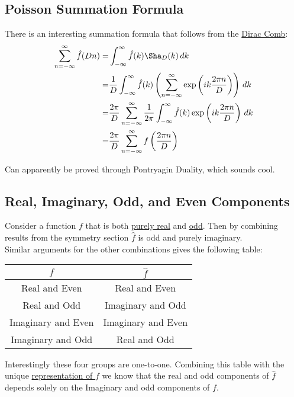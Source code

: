 \documentclass[12pt]{report}
\begin{document}
\subsection{Poisson Summation Formula}
There is an interesting summation formula that follows from the \hyperref[appx:dirac-comb]{Dirac Comb}:
\begin{equation*}
\begin{aligned}
	\sum_{n=-\infty}^{\infty}\hat{f}(Dn) = & \int_{-\infty}^{\infty}\hat{f}(k)\Sha_D(k)\,dk \\
	= &\frac{1}{D} \int_{-\infty}^{\infty}\hat{f}(k)\left(\sum_{n=-\infty}^{\infty}\exp\left(ik \frac{2\pi n}{D}\right)\right)\,dk\\
	= &\frac{2\pi}{D} \sum_{n=-\infty}^{\infty}\frac{1}{2\pi}\int_{-\infty}^{\infty}\hat{f}(k)\exp\left(ik \frac{2\pi n}{D}\right)\,dk\\
	= &\frac{2\pi}{D} \sum_{n=-\infty}^{\infty}f\left(\frac{2\pi n}{D}\right)\\
\end{aligned}
\end{equation*}

Can apparently be proved through Pontryagin Duality, which sounds cool. 

\subsection{Real, Imaginary, Odd, and Even Components}
Consider a function $f$ that is both \hyperref[sec:conjugation-sym]{purely real} and \hyperref[sec:parity-sym]{odd}.
Then by combining results from the symmetry section $\hat{f}$ is odd and purely imaginary.
\\

Similar arguments for the other combinations gives the following table:

\begin{center}
\begin{tabular}{c|c}
	$f$ & $\hat{f}$ \\ \hline
	Real and Even & Real and Even \\
	Real and Odd & Imaginary and Odd \\
	Imaginary and Even & Imaginary and Even \\
	Imaginary and Odd & Real and Odd \\
\end{tabular}
\end{center}

Interestingly these four groups are one-to-one.
Combining this table with the unique \hyperref[appx:real-img-odd-even]{representation of $f$} we know that the real and odd components of $\hat{f}$ depends solely on the Imaginary and odd components of $f$.
\end{document}
